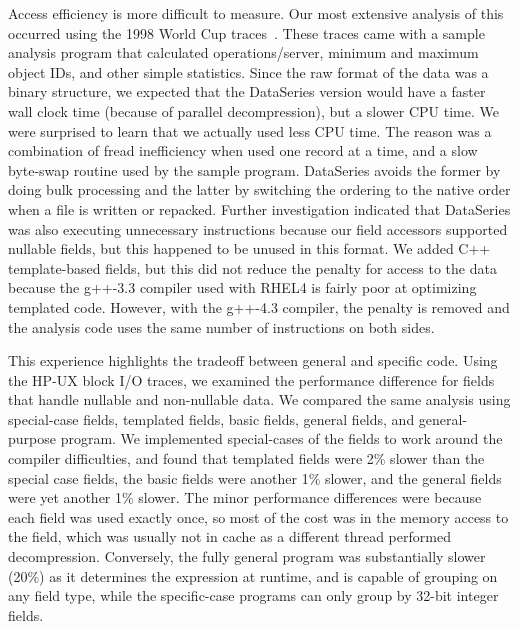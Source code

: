 \documentclass{acm_proc_article-sp}
\begin{document}
Access efficiency 
is more difficult to measure.  Our most
extensive analysis of this occurred using the 1998 World Cup
traces~\cite{ita-wcweb98}.  These traces came with a sample analysis
program that calculated operations/server, minimum and maximum object
IDs, and other simple statistics.  Since the raw format of the data
was a binary structure, we expected that the DataSeries version would
have a faster wall clock time (because of parallel decompression), but
a slower CPU time.  We were surprised to learn that we actually used
less CPU time.  The reason 
was a combination of fread
inefficiency when used one record at a time, and a slow byte-swap
routine used by the sample program.  DataSeries avoids the former by
doing bulk processing and the latter by switching the ordering to the
native order when a file is written or repacked.  Further
investigation indicated that DataSeries was also executing unnecessary
instructions because our field accessors supported nullable fields,
but this happened to be unused in this format.  We added C++ 
template-based fields, 
but this did not reduce the penalty for access to the
data because the g++-3.3 compiler used with RHEL4 is fairly poor at
optimizing templated code.  However, with the g++-4.3 compiler, the
penalty is removed and the analysis code uses the same number of 
instructions on both sides.

This experience highlights the tradeoff between general and specific
code.  
Using the HP-UX block I/O traces,
we examined the performance difference for fields
that handle nullable and non-nullable data. 
We
compared the same analysis using special-case fields, templated
fields, basic fields, general fields, and general-purpose program.  We
implemented special-cases of the fields to work around the compiler
difficulties, and found that templated fields were 2\% slower than the
special case fields, the basic fields were another 1\% slower, and the
general fields were yet another 1\% slower.  The 
minor
performance differences
were because each field was used
exactly once, so most of the cost was in the memory access to the
field, which was usually not in cache as a different thread performed
decompression.  Conversely, the fully general program was
substantially slower (20\%) as it determines the expression at
runtime, and is capable of grouping on any field type, while the
specific-case programs can only group by 32-bit integer fields.  
\end{document}
